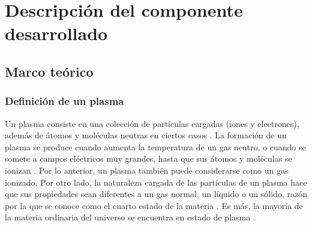 \chapter{Descripción del componente desarrollado}

\section{Marco teórico}

\subsection{Definición de un plasma}

\noindent Un plasma consiste en una colección de partículas cargadas (iones y electrones), además de átomos y moléculas neutras en ciertos casos \cite{Umran, Chen, Parks}. La formación de un plasma se produce cuando aumenta la temperatura de un gas neutro, o cuando se somete a campos eléctricos muy grandes, hasta que sus átomos y moléculas se ionizan \cite{Umran, Chen}. Por lo anterior, un plasma también puede considerarse como un gas ionizado. Por otro lado, la naturaleza cargada de las partículas de un plasma hace que sus propiedades sean diferentes a un gas normal, un líquido o un sólido, razón por la que se conoce como el cuarto estado de la materia \cite{Umran}. Es más, la mayoría de la materia ordinaria del universo se encuentra en estado de plasma \cite{Chen}.



